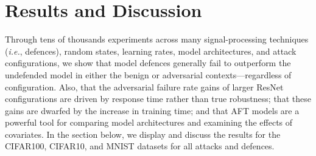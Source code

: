 \section{Results and Discussion}


Through tens of thousands experiments across many signal-processing techniques (\textit{i.e.}, defences), random states, learning rates, model architectures, and attack configurations, we show that model defences generally fail to outperform the undefended model in either the benign or adversarial contexts---regardless of configuration.
Also, that the adversarial failure rate gains of larger ResNet configurations are driven by response time rather than true robustness; that these gains are dwarfed by the increase in training time; and that AFT models are a powerful tool for comparing model architectures and examining the effects of covariates.
In the section below, we display and discuss the results for the CIFAR100, CIFAR10, and MNIST datasets for all attacks and defences.


